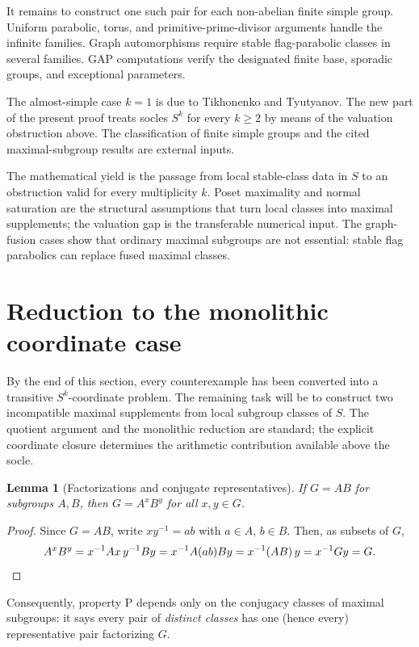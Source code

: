 \documentclass[11pt]{amsart}
\newtheorem{lemma}[theorem]{Lemma}
\theoremstyle{definition}
\theoremstyle{remark}
\begin{document}
It remains to construct one such pair for each non-abelian finite simple group.
Uniform parabolic, torus, and primitive-prime-divisor arguments handle the
infinite families. Graph automorphisms require stable flag-parabolic classes
in several families. GAP computations verify the designated finite base,
sporadic groups, and exceptional parameters.

The almost-simple case $k=1$ is due to Tikhonenko and Tyutyanov. The new part
of the present proof treats socles $S^k$ for every $k\geq2$ by means of the
valuation obstruction above. The classification of finite simple groups and
the cited maximal-subgroup results are external inputs.

The mathematical yield is the passage from local stable-class data in $S$ to
an obstruction valid for every multiplicity $k$. Poset maximality and normal
saturation are the structural assumptions that turn local classes into
maximal supplements; the valuation gap is the transferable numerical input.
The graph-fusion cases show that ordinary maximal subgroups are not essential:
stable flag parabolics can replace fused maximal classes.

\section{Reduction to the monolithic coordinate case}\label{sec:reduction}

By the end of this section, every counterexample has been converted into a
transitive $S^k$-coordinate problem. The remaining task will be to construct
two incompatible maximal supplements from local subgroup classes of $S$.
The quotient argument and the monolithic reduction are standard; the explicit
coordinate closure determines the arithmetic contribution available above the
socle.

\begin{lemma}[Factorizations and conjugate representatives]\label{lem:conj}
If $G=AB$ for subgroups $A,B$, then $G=A^xB^y$ for all $x,y\in G$.
\end{lemma}

\begin{proof}
Since $G=AB$, write $xy^{-1}=ab$ with $a\in A$, $b\in B$. Then, as
subsets of $G$,
\[
A^xB^y=x^{-1}Ax\,y^{-1}By=x^{-1}A(ab)By
 =x^{-1}(AB)\,y=x^{-1}Gy=G. \qedhere
\]
\end{proof}

Consequently, property $\mathrm{P}$ depends only on the conjugacy classes
of maximal subgroups: it says every pair of \emph{distinct classes} has
one (hence every) representative pair factorizing $G$.
\end{document}
